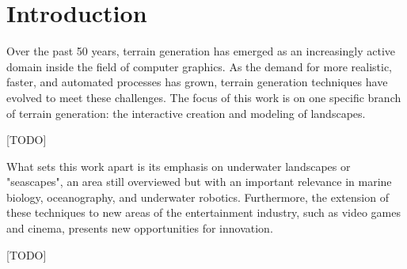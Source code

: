 \chapter{Introduction}
\label{chap:introduction}

Over the past 50 years, terrain generation has emerged as an increasingly active domain inside the field of computer graphics. As the demand for more realistic, faster, and automated processes has grown, terrain generation techniques have evolved to meet these challenges. The focus of this work is on one specific branch of terrain generation: the interactive creation and modeling of landscapes.

[TODO]

What sets this work apart is its emphasis on underwater landscapes or "seascapes", an area still overviewed but with an important relevance in marine biology, oceanography, and underwater robotics. Furthermore, the extension of these techniques to new areas of the entertainment industry, such as video games and cinema, presents new opportunities for innovation.

[TODO]

